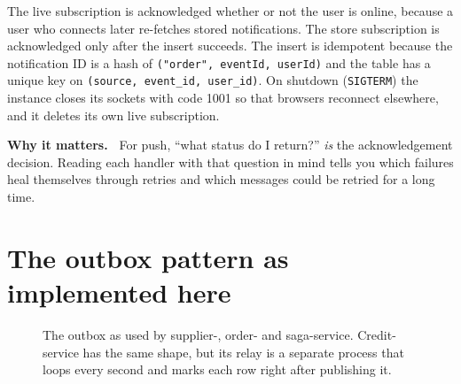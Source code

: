 \documentclass[11pt,a4paper]{article}
\newcommand{\code}[1]{\nolinkurl{#1}}
\newenvironment{why}{%
  \def\FrameCommand{{\color{accent}\vrule width 2.5pt}\hspace{8pt}}%
  \MakeFramed{\advance\hsize-\width\FrameRestore}\noindent\textbf{Why it matters.\ }}%
  {\endMakeFramed}
\begin{document}
The live subscription is acknowledged whether or not the user is online, because a user
who connects later re-fetches stored notifications. The store subscription is
acknowledged only after the insert succeeds. The insert is idempotent because the
notification ID is a hash of \code{("order", eventId, userId)} and the table has a unique
key on \code{(source, event_id, user_id)}. On shutdown (\code{SIGTERM}) the instance
closes its sockets with code 1001 so that browsers reconnect elsewhere, and it deletes
its own live subscription.

\begin{why}
For push, ``what status do I return?'' \emph{is} the acknowledgement decision. Reading
each handler with that question in mind tells you which failures heal themselves through
retries and which messages could be retried for a long time.
\end{why}

\section{The outbox pattern as implemented here}
\label{sec:outbox}

\begin{figure}[!htbp]
\centering
{}
\caption{The outbox as used by supplier-, order- and saga-service. Credit-service has
the same shape, but its relay is a separate process that loops every second and marks each row right after publishing it.}
\label{fig:outbox}
\end{figure}
\end{document}
